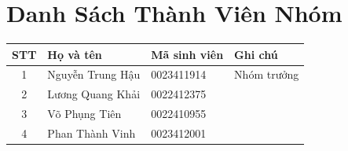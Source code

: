 \chapter*{Danh Sách Thành Viên Nhóm}

\vspace{1cm}

\begin{center}
    \renewcommand{\arraystretch}{2} %
    \begin{tabular}{|c|p{6cm}|p{4cm}|p{4cm}|}
        \hline
        \textbf{STT} & \textbf{Họ và tên} & \textbf{Mã sinh viên} & \textbf{Ghi chú} \\
        \hline
        1 & Nguyễn Trung Hậu & 0023411914 & Nhóm trưởng\\
        \hline
        2 & Lương Quang Khải  & 0022412375 & \\
        \hline
        3 & Võ Phụng Tiên & 0022410955 & \\
        \hline
        4 & Phan Thành Vinh & 0023412001 & \\
        \hline
    \end{tabular}
\end{center}
